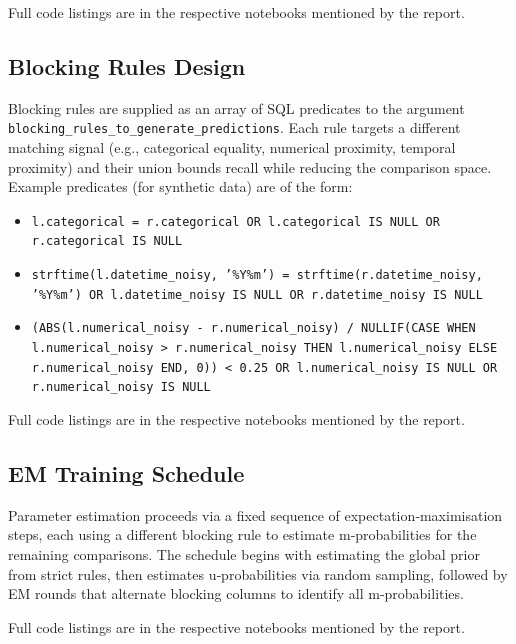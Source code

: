 Full code listings are in the respective notebooks mentioned by the report.

\subsection{Blocking Rules Design}
\label{sec:blocking_rules}
Blocking rules are supplied as an array of SQL predicates to the argument \texttt{blocking\_rules\_to\_generate\_predictions}.
Each rule targets a different matching signal (e.g., categorical equality, numerical proximity, temporal proximity) and their union bounds recall while reducing the comparison space.
Example predicates (for synthetic data) are of the form:
\begin{itemize}
	\item \texttt{l.categorical = r.categorical OR l.categorical IS NULL OR r.categorical IS NULL}
	\item \texttt{strftime(l.datetime\_noisy, '\%Y\%m') = strftime(r.datetime\_noisy, '\%Y\%m') OR l.datetime\_noisy IS NULL OR r.datetime\_noisy IS NULL}
	\item \texttt{(ABS(l.numerical\_noisy - r.numerical\_noisy) / NULLIF(CASE WHEN l.numerical\_noisy > r.numerical\_noisy THEN l.numerical\_noisy ELSE r.numerical\_noisy END, 0)) < 0.25 OR l.numerical\_noisy IS NULL OR r.numerical\_noisy IS NULL}
\end{itemize}

Full code listings are in the respective notebooks mentioned by the report.

\subsection{EM Training Schedule}
\label{sec:em_training}
Parameter estimation proceeds via a fixed sequence of expectation‑maximisation steps, each using a different blocking rule to estimate m‑probabilities for the remaining comparisons.
The schedule begins with estimating the global prior from strict rules, then estimates u‑probabilities via random sampling, followed by EM rounds that alternate blocking columns to identify all m‑probabilities.

Full code listings are in the respective notebooks mentioned by the report.
